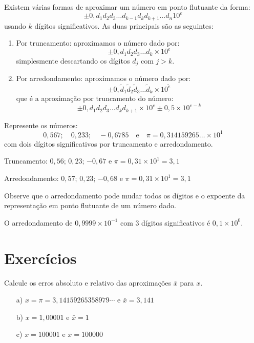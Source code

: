 \documentclass[main.tex]{subfiles}
\begin{document}
Existem várias formas de aproximar um número em ponto flutuante da forma:
\begin{equation*}
  \pm 0,d_{1}d_{2}d_{3}\ldots d_{k-1}d_kd_{k+1}\ldots d_n 10^e
\end{equation*}
usando $k$ dígitos significativos. As duas principais são as seguintes:
\begin{enumerate}
\item Por truncamento: aproximamos o número dado por:
$$
\pm 0,d_{1}d_{2}d_{3}\ldots d_{k}\times 10^e
$$
simplesmente descartando os dígitos $d_{j}$ com $j > k$.
\item Por arredondamento: aproximamos o número dado por:
$$
\pm 0,\tilde{d}_{1}\tilde{d}_{2}\tilde{d}_{3}\ldots \tilde{d}_{k}\times 10^{\tilde{e}}
$$
que é a aproximação por truncamento do número:
$$
\pm 0,d_{1}d_{2}d_{3}\ldots d_{k}d_{k+1} \times 10^e \pm 0,5 \times 10^{e-k}
$$
\end{enumerate}

\begin{ex} Represente os números:
  \begin{equation*}
    0,567;\quad 0,233;\quad -0,6785 \quad\mbox{e}\quad \pi = 0,314159265 \ldots \times 10^1
  \end{equation*}
com dois dígitos significativos por truncamento e arredondamento.
\end{ex}
\begin{sol}
Truncamento: $0,56$; $0,23$; $-0,67$ e $\pi =0,31\times 10^1 =3,1$

Arredondamento: $0,57$; $0,23$; $-0,68$ e $\pi = 0,31\times 10^1 = 3,1$  
\end{sol}

\begin{obs}
  Observe que o arredondamento pode mudar todos os dígitos e o expoente da representação em ponto flutuante de um número dado.
\end{obs}

\begin{ex}
  O arredondamento de $0,9999\times 10^{-1}$ com $3$ dígitos significativos é $0,1\times 10^{0}$.
\end{ex}

\section*{Exercícios}

\begin{Exercise} Calcule os erros absoluto e relativo das aproximações $\bar{x}$ para $x$.
  \begin{itemize}
  \item[a)] $x=\pi=3,14159265358979\cdots$ e $\bar{x}=3,141$
  \item[b)] $x=1,00001$ e $\bar{x}=1$
  \item[c)] $x=100001$ e $\bar{x}=100000$
  \end{itemize}
\end{Exercise}
\end{document}
